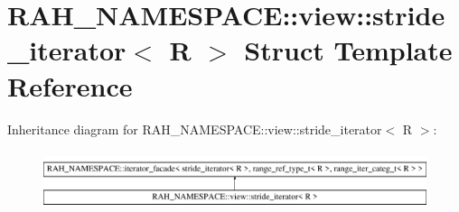 \hypertarget{struct_r_a_h___n_a_m_e_s_p_a_c_e_1_1view_1_1stride__iterator}{}\section{R\+A\+H\+\_\+\+N\+A\+M\+E\+S\+P\+A\+CE\+::view\+::stride\+\_\+iterator$<$ R $>$ Struct Template Reference}
\label{struct_r_a_h___n_a_m_e_s_p_a_c_e_1_1view_1_1stride__iterator}
Inheritance diagram for R\+A\+H\+\_\+\+N\+A\+M\+E\+S\+P\+A\+CE\+::view\+::stride\+\_\+iterator$<$ R $>$\+:\begin{figure}[H]
\begin{center}
\leavevmode
\includegraphics[height=1.741835cm]{struct_r_a_h___n_a_m_e_s_p_a_c_e_1_1view_1_1stride__iterator}
\end{center}
\end{figure}
